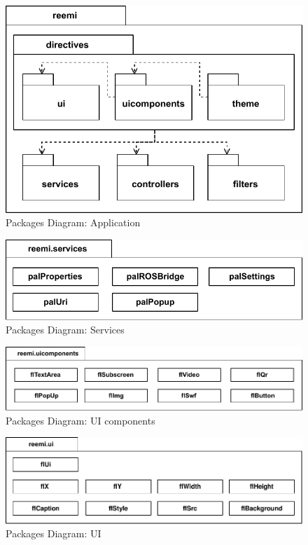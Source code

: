 \begin{figure}[htb]
    \centering
    \includegraphics{figures/design-package-reemi.pdf}
    \caption{Packages Diagram: Application}
    \label{fig:pkg-reemi}
\end{figure}

\begin{figure}[htb]
    \centering
    \includegraphics{figures/design-package-services.pdf}
    \caption{Packages Diagram: Services}
    \label{fig:pkg-services}
\end{figure}

\begin{figure}[htb]
    \centering
    \includegraphics{figures/design-package-uicomponents.pdf}
    \caption{Packages Diagram: UI components}
    \label{fig:pkg-uicomponents}
\end{figure}

\begin{figure}[htb]
    \centering
    \includegraphics{figures/design-package-ui.pdf}
    \caption{Packages Diagram: UI}
    \label{fig:pkg-ui}
\end{figure}

